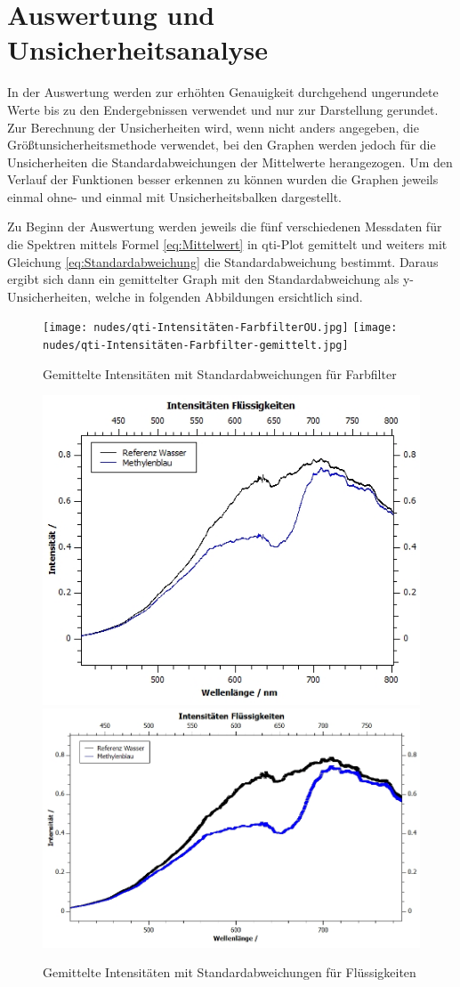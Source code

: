 \documentclass[12pt,a4paper,twoside]{article}
\begin{document}
\section{Auswertung und Unsicherheitsanalyse} %

In der Auswertung werden zur erhöhten Genauigkeit durchgehend ungerundete Werte bis zu den Endergebnissen verwendet und nur zur Darstellung gerundet. \\
Zur Berechnung der Unsicherheiten wird, wenn nicht anders angegeben, die Größtunsicherheitsmethode verwendet, bei den Graphen werden jedoch für die Unsicherheiten die Standardabweichungen der Mittelwerte herangezogen. 
Um den Verlauf der Funktionen besser erkennen zu können wurden die Graphen jeweils einmal ohne- und einmal mit Unsicherheitsbalken dargestellt.\newline

\noindent
Zu Beginn der Auswertung werden jeweils die fünf verschiedenen Messdaten für die Spektren mittels Formel \ref{eq:Mittelwert} in qti-Plot gemittelt und weiters mit Gleichung \ref{eq:Standardabweichung} die Standardabweichung bestimmt. Daraus ergibt sich dann ein gemittelter Graph mit den Standardabweichung als y-Unsicherheiten, welche in folgenden Abbildungen ersichtlich sind.

\begin{figure}[H]
    \centering
    \texttt{[image: nudes/qti-Intensitäten-FarbfilterOU.jpg]}
    \texttt{[image: nudes/qti-Intensitäten-Farbfilter-gemittelt.jpg]}
    \caption{Gemittelte Intensitäten mit Standardabweichungen für Farbfilter}
    \label{fig:GemittelteGraphenIntensitätenFarbfilter}
\end{figure}

\begin{figure}[H]
    \centering
    \includegraphics[width=0.4\linewidth]{nudes/qti-Intensitäten-Flüssigkeiten-gemitteltOU.jpg}
    \includegraphics[width=0.4\linewidth]{nudes/qti-Intensitäten-Flüssigkeiten-gemittelt.jpg}
    \caption{Gemittelte Intensitäten mit Standardabweichungen für Flüssigkeiten}
    \label{fig:GemittelteGraphenIntensitätenFlüssigkeiten}
\end{figure}
\end{document}
